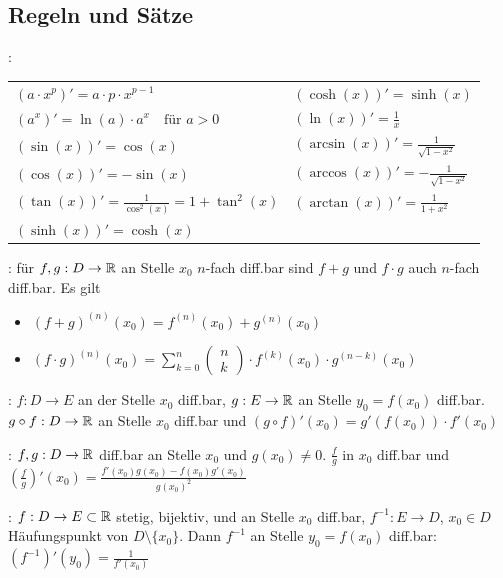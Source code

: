 \subsection{Regeln und Sätze}

\begin{minipage}{\linewidth}
\Satz {}:

\begin{tabular}{ll}
    $(a \cdot x^p)' = a \cdot p \cdot x^{p-1}$          & $(\cosh(x))' = \sinh(x)$ \\
    $(a^x)' = \ln(a) \cdot a^x \quad \text{für } a > 0$ & $(\ln(x))' = \frac{1}{x}$ \\
    $(\sin(x))' = \cos(x)$                              & $(\arcsin(x))' = \frac{1}{\sqrt{1 - x^2}}$\\
    $(\cos(x))' = -\sin(x)$                             & $(\arccos(x))' = -\frac{1}{\sqrt{1 - x^2}}$ \\
    $(\tan(x))' = \frac{1}{\cos^2(x)} = 1 + \tan^2(x)$  & $(\arctan(x))' = \frac{1}{1 + x^2}$ \\
    $(\sinh(x))' = \cosh(x)$
\end{tabular}
\end{minipage}

\Satz {}: für $f,g: D \to \mathbb{R}$ an Stelle $x_0$ $n$-fach diff.bar sind
$f+g$ und $f\cdot g$ auch $n$-fach diff.bar. Es gilt
\vspace{-0.6em}
\begin{itemize}
    \item $(f+g)^{(n)}(x_0) = f^{(n)}(x_0) + g^{(n)}(x_0)$
    \item $(f\cdot g)^{(n)}(x_0) = \sum_{k=0}^{n} \begin{pmatrix}n\\k\end{pmatrix} \cdot f^{(k)}(x_0) \cdot g^{(n-k)}(x_0)$
\end{itemize}

\Satz {}: $f: D \to E$ an der Stelle $x_0$ diff.bar, $g: E \to \mathbb{R}$
an Stelle $y_0 = f(x_0)$ diff.bar. $g \circ f: D \to \mathbb{R}$ an Stelle $x_0$ diff.bar und
$(g \circ f)'(x_0) = g'(f(x_0)) \cdot f'(x_0)$

\Satz {}: $f,g: D \to \mathbb{R}$ diff.bar an Stelle $x_0$ und $g(x_0) \ne 0$.
$\frac{f}{g}$ in $x_0$ diff.bar und $\left(\frac{f}{g}\right)'(x_0) = \frac{f'(x_0)g(x_0) - f(x_0)g'(x_0)}{g(x_0)^2}$

\Satz {}: $f: D \to E \subset \mathbb{R}$ stetig, bijektiv,  und an Stelle $x_0$ diff.bar,
$f^{-1}: E \to D$, $x_0 \in D$ Häufungspunkt von $D \setminus \{x_0\}$.
Dann $f^{-1}$ an Stelle $y_0 = f(x_0)$ diff.bar: $\left(f^{-1}\right)'(y_0) = \frac{1}{f'(x_0)}$

